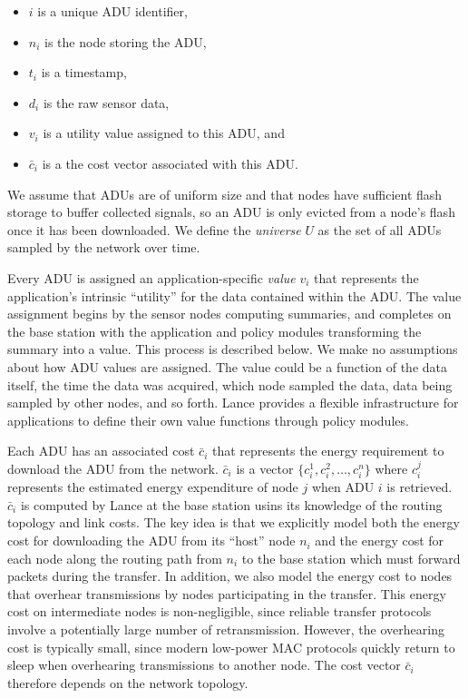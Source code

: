 \begin{itemize}

\item $i$ is a unique ADU identifier,

\item $n_i$ is the node storing the ADU,

\item $t_i$ is a timestamp,

\item $d_i$ is the raw sensor data,

\item $v_i$ is a utility value assigned to this ADU, and

\item $\bar{c}_i$ is a the cost vector associated with this ADU.

\end{itemize}

We assume that ADUs are of uniform size and that nodes have sufficient flash
storage to buffer collected signals, so an ADU is only evicted from a node's
flash once it has been downloaded. We define the \textit{universe} $U$ as the
set of all ADUs sampled by the network over time.

Every ADU is assigned an application-specific \textit{value} $v_i$ that
represents the application's intrinsic ``utility'' for the data contained
within the ADU. The value assignment begins by the sensor nodes computing
summaries, and completes on the base station with the application and policy
modules transforming the summary into a value. This process is described
below. We make no assumptions about how ADU values are assigned. The value
could be a function of the data itself, the time the data was acquired, which
node sampled the data, data being sampled by other nodes, and so forth.
Lance provides a flexible infrastructure for applications to define their own
value functions through policy modules.

Each ADU has an associated cost $\bar{c}_i$ that represents the energy
requirement to download the ADU from the network. $\bar{c}_i$ is a vector $\{
c_i^1, c_i^2, \ldots, c_i^n \}$ where $c_i^j$ represents the estimated energy
expenditure of node $j$ when ADU $i$ is retrieved. $\bar{c}_i$ is computed by
Lance at the base station usins its knowledge of the routing topology and
link costs. The key idea is that we explicitly model both the energy cost for
downloading the ADU from its ``host'' node $n_i$ and the energy cost for each
node along the routing path from $n_i$ to the base station which must forward
packets during the transfer. In addition, we also model the energy cost to
nodes that overhear transmissions by nodes participating in the transfer.
This energy cost on intermediate nodes is non-negligible, since reliable
transfer protocols involve a potentially large number of retransmission.
However, the overhearing cost is typically small, since modern low-power MAC
protocols quickly return to sleep when overhearing transmissions to another
node. The cost vector $\bar{c}_i$ therefore depends on the network topology.

